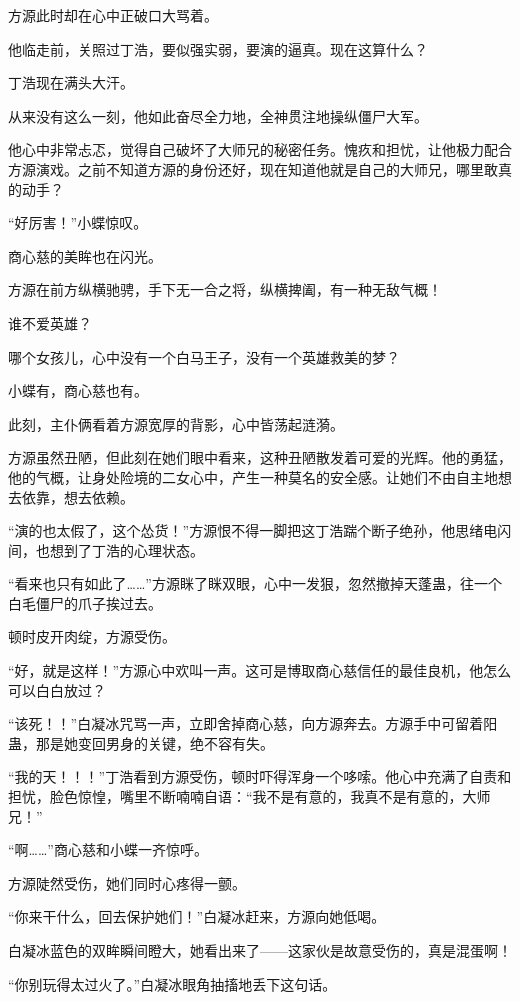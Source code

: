 \begin{this_body}
方源此时却在心中正破口大骂着。

他临走前，关照过丁浩，要似强实弱，要演的逼真。现在这算什么？

丁浩现在满头大汗。

从来没有这么一刻，他如此奋尽全力地，全神贯注地操纵僵尸大军。

他心中非常忐忑，觉得自己破坏了大师兄的秘密任务。愧疚和担忧，让他极力配合方源演戏。之前不知道方源的身份还好，现在知道他就是自己的大师兄，哪里敢真的动手？

“好厉害！”小蝶惊叹。

商心慈的美眸也在闪光。

方源在前方纵横驰骋，手下无一合之将，纵横捭阖，有一种无敌气概！

谁不爱英雄？

哪个女孩儿，心中没有一个白马王子，没有一个英雄救美的梦？

小蝶有，商心慈也有。

此刻，主仆俩看着方源宽厚的背影，心中皆荡起涟漪。

方源虽然丑陋，但此刻在她们眼中看来，这种丑陋散发着可爱的光辉。他的勇猛，他的气概，让身处险境的二女心中，产生一种莫名的安全感。让她们不由自主地想去依靠，想去依赖。

“演的也太假了，这个怂货！”方源恨不得一脚把这丁浩踹个断子绝孙，他思绪电闪间，也想到了丁浩的心理状态。

“看来也只有如此了……”方源眯了眯双眼，心中一发狠，忽然撤掉天蓬蛊，往一个白毛僵尸的爪子挨过去。

顿时皮开肉绽，方源受伤。

“好，就是这样！”方源心中欢叫一声。这可是博取商心慈信任的最佳良机，他怎么可以白白放过？

“该死！！”白凝冰咒骂一声，立即舍掉商心慈，向方源奔去。方源手中可留着阳蛊，那是她变回男身的关键，绝不容有失。

“我的天！！！”丁浩看到方源受伤，顿时吓得浑身一个哆嗦。他心中充满了自责和担忧，脸色惊惶，嘴里不断喃喃自语：“我不是有意的，我真不是有意的，大师兄！”

“啊……”商心慈和小蝶一齐惊呼。

方源陡然受伤，她们同时心疼得一颤。

“你来干什么，回去保护她们！”白凝冰赶来，方源向她低喝。

白凝冰蓝色的双眸瞬间瞪大，她看出来了——这家伙是故意受伤的，真是混蛋啊！

“你别玩得太过火了。”白凝冰眼角抽搐地丢下这句话。


\end{this_body}
